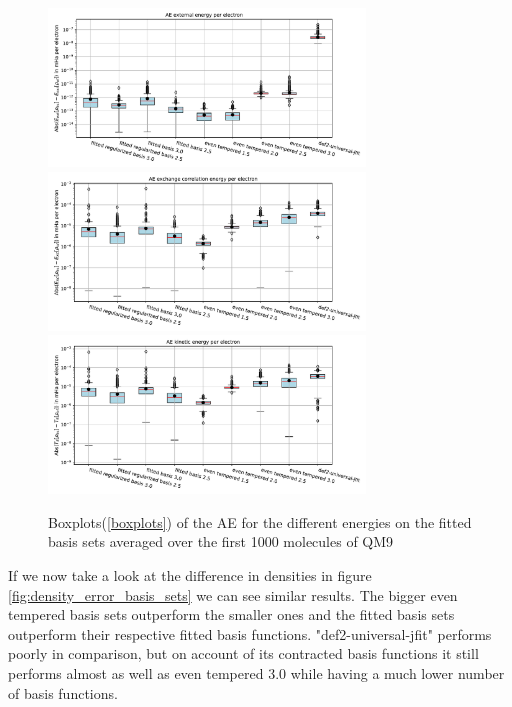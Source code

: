 {\begin{figure}
    \includegraphics[width=0.75\textwidth]{chapters/results/results_images/AE_ext_energy_on_hartree+external_MOFDFT_for_different_basis_sets}
    \includegraphics[width=0.75\textwidth]{chapters/results/results_images/AE_xc_energy_on_hartree+external_MOFDFT_for_different_basis_sets}
    \includegraphics[width=0.75\textwidth]{chapters/results/results_images/AE_kin_energy_on_hartree+external_MOFDFT_for_different_basis_sets}
    \caption{Boxplots(\ref{boxplots}) of the AE for the different energies on the fitted basis sets averaged over the first 1000 molecules of QM9} \label{fig:AE_energies_basis_sets}
\end{figure}
If we now take a look at the difference in densities in figure \ref{fig:density_error_basis_sets} we can see similar results. The bigger even tempered basis sets outperform the smaller ones and the fitted basis sets outperform their respective fitted basis functions. "def2-universal-jfit" performs poorly in comparison, but on account of its contracted basis functions it still performs almost as well as even tempered 3.0 while having a much lower number of basis functions.\\
}
